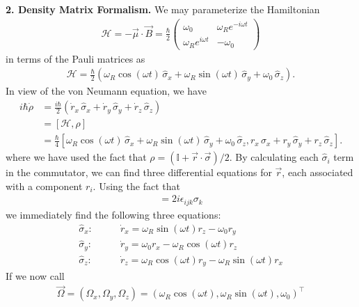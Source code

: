 \documentclass{article}
\theoremstyle{definition}
\newcommand{\ham}{\mathcal{H}}
\newcommand{\f}[2]{\frac{#1}{#2}}
\newcommand{\lp}{\left(}
\newcommand{\rp}{\right)}
\begin{document}
	
	
	
	
	

\noindent \textbf{2. Density Matrix Formalism.} We may parameterize the Hamiltonian
\begin{align*}
\ham = -\vec{\mu} \cdot \vec{B} = \f{\hbar}{2}\begin{pmatrix}
\omega_0 & \omega_R e^{-i\omega t} \\ \omega_R e^{i\omega t} & -\omega_0
\end{pmatrix}
\end{align*}
in terms of the Pauli matrices as 
\begin{align*}
\ham = \f{\hbar}{2}\lp 
\omega_R \cos(\omega t) \, \hat \sigma_x + 
\omega_R \sin(\omega t) \, \hat \sigma_y + 
\omega_0 \, \hat\sigma_z \rp.
\end{align*}
In view of the von Neumann equation, we have
\begin{align*}
i\hbar \dot \rho &= \f{i\hbar}{2} (\dot r_x \,\hat\sigma_x + \dot r_y \,\hat\sigma_y + \dot r_z \,\hat\sigma_z ) \\
&= [\ham, \rho] \\
&= \f{\hbar}{4}[\omega_R \cos(\omega t) \, \hat \sigma_x + 
\omega_R \sin(\omega t) \, \hat \sigma_y + 
\omega_0 \, \hat\sigma_z , r_x\,\hat\sigma_x + r_y \, \hat \sigma_y + r_z \, \hat \sigma_z].
\end{align*}
where we have used the fact that $\rho = (\mathbb{I} + \vec{r}\cdot \vec{\sigma})/2$. By calculating each $\hat \sigma_i$ term in the commutator, we can find three differential equations for $\vec{r}$, each associated with a component $r_i$. Using the fact that
\begin{align*}
[\sigma_i, \sigma_j] = 2i \epsilon_{ijk} \sigma_k
\end{align*}
we immediately find the following three equations:
\begin{align*}
\hat \sigma_x : &\quad\quad \dot r_x = \omega_R \sin(\omega t) r_z - \omega_0 r_y \\
\hat \sigma_y : &\quad\quad \dot r_y = \omega_0 r_x - \omega_R \cos(\omega t) r_z \\
\hat \sigma_z : &\quad\quad \dot r_z = \omega_R \cos(\omega t) r_y - \omega_R \sin(\omega t) r_x
\end{align*}
If we now call
\begin{align*}
\vec{\Omega} = (\Omega_x, \Omega_y, \Omega_z)  =(\omega_R \cos(\omega t), \omega_R \sin(\omega t), \omega_0)^\top
\end{align*}
\end{document}

